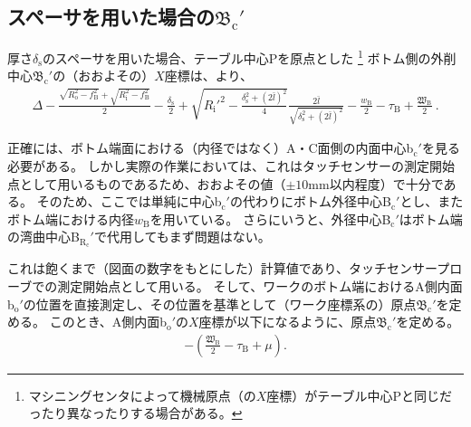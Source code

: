 \subsection[スペーサを用いた場合の\texorpdfstring{$\mathfrak B_\mathrm c'$}{Bc'}]
           {スペーサを用いた場合の$\boldsymbol{\mathfrak B_\mathrm c'}$}
厚さ$\delta_\mathrm s$のスペーサを用いた場合、テーブル中心Pを原点とした
\footnote{マシニングセンタによって機械原点（の$X$座標）がテーブル中心Pと同じだったり異なったりする場合がある。}\relax
ボトム側の外削中心$\mathfrak B_\mathrm c'$の（おおよその）$X$座標は、より、
\begin{align*}
  \Delta-\frac{\sqrt{R_\mathrm o^2-f_\mathrm B^2}+\sqrt{R_\mathrm i^2-f_\mathrm B^2}}2-\frac{\delta_\mathrm s}2
  +\sqrt{R_\mathrm i'^2-\frac{\delta_\mathrm s^2+(2\bar l)^2}4}\frac{2\bar l}{\sqrt{\delta_\mathrm s^2+(2\bar l)^2}}
  -\frac{w_\mathrm B}2-\tau_\mathrm B+\frac{\mathfrak W_\mathrm B}2\ .
\end{align*}
\begin{hosoku}
正確には、ボトム端面における（内径ではなく）A・C面側の内面中心b$_\mathrm c'$を見る必要がある。
しかし実際の作業においては、これはタッチセンサーの測定開始点として用いるものであるため、おおよその値（$\pm10$mm以内程度）で十分である。
そのため、ここでは単純に中心b$_\mathrm c'$の代わりにボトム外径中心B$_\mathrm c'$とし、またボトム端における内径$w_\mathrm B$を用いている。
さらにいうと、外径中心B$_\mathrm c'$はボトム端の湾曲中心B$_{\mathrm R_\mathrm c}'$で代用してもまず問題はない。
\end{hosoku}
これは飽くまで（図面の数字をもとにした）計算値であり、タッチセンサープローブでの測定開始点として用いる。
そして、ワークのボトム端におけるA側内面b$_\mathrm o'$の位置を直接測定し、その位置を基準として（ワーク座標系の）原点$\mathfrak B_\mathrm c'$を定める。
このとき、A側内面b$_\mathrm o'$の$X$座標が以下になるように、原点$\mathfrak B_\mathrm c'$を定める。
\begin{align*}
  -\left(\frac{\mathfrak W_\mathrm B}2-\tau_\mathrm B+\mu\right).
\end{align*}

